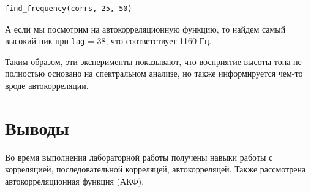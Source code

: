 \documentclass[a4paper,12pt]{report}
\begin{document}
\begin{lstlisting}[caption=Поиск пика]
find_frequency(corrs, 25, 50)
\end{lstlisting}

А если мы посмотрим на автокорреляционную функцию, то найдем самый высокий пик при \texttt{lag} = 38, что соответствует 1160 Гц.

Таким образом, эти эксперименты показывают, что восприятие высоты тона не полностью основано на спектральном анализе, но также информируется чем-то вроде автокорреляции.

\chapter{Выводы}

Во время выполнения лабораторной работы получены навыки работы с корреляцией, последовательной корреляцей, автокорреляцей. Также рассмотрена автокорреляционная функция (АКФ).
\end{document}
